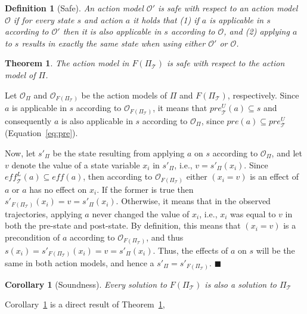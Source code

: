 \documentclass{article}
\newtheorem{definition}{Definition}
\newtheorem{corollary}{Corollary}
\newenvironment{proof}{\noindent{\bf Proof:~~}}{\qed}
\newcommand{\qed}{\hfill\ensuremath{\blacksquare}}
\newcommand{\eff}{\textit{eff}}
\newcommand{\pre}{\textit{pre}}
\newtheorem{theorem}{Theorem}
\newcommand{\roni}[1]{[[Roni:#1]]}
\begin{document}
	\begin{definition}[Safe]
		An action model $\mathcal{O}'$ is safe with respect to an action model $\mathcal{O}$
		if for every state $s$ and action $a$ it holds that (1) if $a$ is applicable in $s$ according to $\mathcal{O}'$ then it is also applicable in $s$ according to $\mathcal{O}$, and (2) applying $a$ to $s$ results in exactly the same state when using either $\mathcal{O}'$ or $\mathcal{O}$. 
		\label{def:safe}
	\end{definition}
	
	\begin{theorem}
		The action model in $F(\Pi_\mathcal{T})$ 
		is safe with respect to the action model of $\Pi$. 
		\label{the:safeness}
	\end{theorem}
	\begin{proof}
		Let $\mathcal{O}_\Pi$ and $\mathcal{O}_{F(\Pi_\mathcal{T})}$ be the action models of $\Pi$ and $F(\Pi_\mathcal{T})$, respectively. 
		Since $a$ is applicable in $s$ according to $\mathcal{O}_{F(\Pi_\mathcal{T})}$, it means that $\pre_\mathcal{T}^U(a)\subseteq s$ and consequently  $a$ is also applicable in $s$ according to $\mathcal{O}_\Pi$, since $\pre(a)\subseteq \pre_\mathcal{T}^U$ (Equation~\ref{eq:pre}). 
		
		
		Now, let $s'_\Pi$ be the state resulting from applying $a$ on $s$ according to $\mathcal{O}_\Pi$, and let $v$ denote the value of a state variable $x_i$ in $s'_\Pi$, i.e., $v=s'_\Pi(x_i)$. 
		Since $\eff_\mathcal{T}^L(a)\subseteq \eff(a)$, 
		then according to $\mathcal{O}_{F(\Pi_\mathcal{T})}$ 
		either $(x_i=v)$ is an effect of $a$ 
		or $a$ has no effect on $x_i$. 
		If the former is true then $s'_{F(\Pi_{\mathcal{T}})}(x_i)=v=s'_\Pi(x_i)$. 
		Otherwise, it means that in the observed trajectories, applying $a$ 
		never changed the value of $x_i$, i.e., $x_i$ was equal to $v$ in both the pre-state and post-state. By definition, this means that $(x_i=v)$ is a precondition of $a$ 
		according to $\mathcal{O}_{F(\Pi_\mathcal{T})}$, 
		and thus $s(x_i)=s'_{F(\Pi_\mathcal{T})}(x_i)=v=s'_\Pi(x_i)$. 
		Thus, the effects of $a$ on $s$ will be the same in both action models, and hence a 
		$s'_\Pi=s'_{F(\Pi_\mathcal{T})}$. 
	\end{proof}
	\begin{corollary}[Soundness]
		Every solution to $F(\Pi_\mathcal{T})$ is also a solution to $\Pi_\mathcal{T}$
		\label{the:soundness}
	\end{corollary}
	Corollary~\ref{the:soundness} is a direct result of Theorem~\ref{the:safeness}, 
\end{document}

